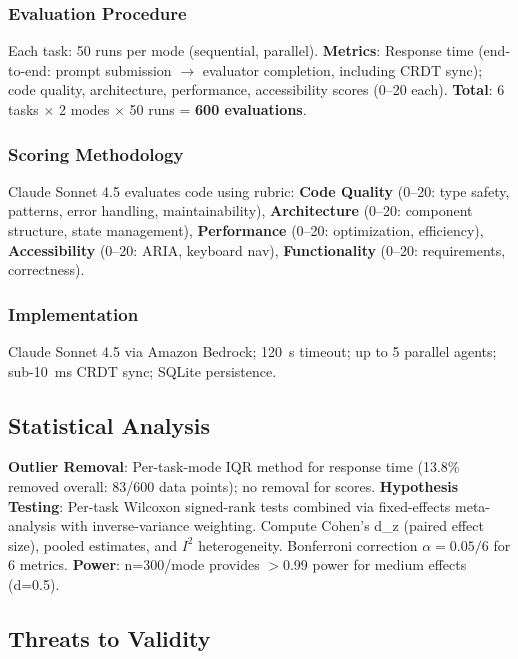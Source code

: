 \documentclass{article}
\begin{document}
\subsubsection{Evaluation Procedure}

Each task: 50 runs per mode (sequential, parallel). \textbf{Metrics}: Response time (end-to-end: prompt submission $\rightarrow$ evaluator completion, including CRDT sync); code quality, architecture, performance, accessibility scores (0--20 each). \textbf{Total}: 6 tasks $\times$ 2 modes $\times$ 50 runs = \textbf{600 evaluations}.

\subsubsection{Scoring Methodology}

Claude Sonnet 4.5 evaluates code using rubric: \textbf{Code Quality} (0--20: type safety, patterns, error handling, maintainability), \textbf{Architecture} (0--20: component structure, state management), \textbf{Performance} (0--20: optimization, efficiency), \textbf{Accessibility} (0--20: ARIA, keyboard nav), \textbf{Functionality} (0--20: requirements, correctness).

\subsubsection{Implementation}

Claude Sonnet 4.5 via Amazon Bedrock; 120~s timeout; up to 5 parallel agents; sub-10~ms CRDT sync; SQLite persistence.

\subsection{Statistical Analysis}

\textbf{Outlier Removal}: Per-task-mode IQR method for response time (13.8\% removed overall: 83/600 data points); no removal for scores. \textbf{Hypothesis Testing}: Per-task Wilcoxon signed-rank tests combined via fixed-effects meta-analysis with inverse-variance weighting. Compute Cohen's d\_z (paired effect size), pooled estimates, and $I^{2}$ heterogeneity. Bonferroni correction $\alpha = 0.05/6$ for 6 metrics. \textbf{Power}: n=300/mode provides $>$0.99 power for medium effects (d=0.5).

\subsection{Threats to Validity}
\end{document}
